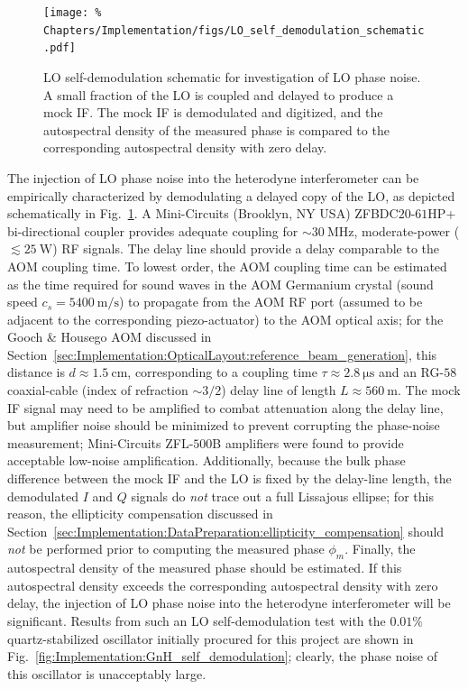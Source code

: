 \begin{figure}
  \centering
  \texttt{[image: \%
    Chapters/Implementation/figs/LO\_self\_demodulation\_schematic.pdf]}
  \caption[LO self-demodulation schematic for investigation of LO phase noise]{%
    LO self-demodulation schematic for investigation of LO phase noise.
    A small fraction of the LO is coupled and delayed to produce a mock IF.
    The mock IF is demodulated and digitized, and
    the autospectral density of the measured phase is compared
    to the corresponding autospectral density with zero delay.
  }
\label{fig:Implementation:LO_self_demodulation_schematic}
\end{figure}

The injection of LO phase noise into the heterodyne interferometer
can be empirically characterized by demodulating
a delayed copy of the LO,
as depicted schematically in
Fig.~\ref{fig:Implementation:LO_self_demodulation_schematic}.
A Mini-Circuits (Brooklyn, NY USA) {ZFBDC$20$-$61$HP+} bi-directional coupler
provides adequate coupling for $\sim \SI{30}{\mega\hertz}$,
moderate-power ($\lesssim \SI{25}{\watt}$) RF signals.
The delay line should provide a delay comparable to the AOM coupling time.
To lowest order, the AOM coupling time can be estimated
as the time required for sound waves in the AOM Germanium crystal
(sound speed $c_s = \SI{5400}{\meter\per\second}$)
to propagate from the AOM RF port
(assumed to be adjacent to the corresponding piezo-actuator)
to the AOM optical axis;
for the Gooch \& Housego AOM discussed in
Section~\ref{sec:Implementation:OpticalLayout:reference_beam_generation},
this distance is $d \approx \SI{1.5}{\centi\meter}$,
corresponding to a coupling time $\tau \approx \SI{2.8}{\micro\second}$ and
an RG-$58$ coaxial-cable (index of refraction $\sim 3 / 2$)
delay line of length $L \approx \SI{560}{\meter}$.
The mock IF signal may need to be amplified
to combat attenuation along the delay line, but
amplifier noise should be minimized
to prevent corrupting the phase-noise measurement;
Mini-Circuits {ZFL-$500$B} amplifiers
were found to provide acceptable low-noise amplification.
Additionally, because the bulk phase difference
between the mock IF and the LO
is fixed by the delay-line length,
the demodulated $I$ and $Q$ signals
do \emph{not} trace out a full Lissajous ellipse;
for this reason, the ellipticity compensation discussed in
Section~\ref{sec:Implementation:DataPreparation:ellipticity_compensation}
should \emph{not} be performed prior to computing the measured phase $\phi_m$.
Finally, the autospectral density of the measured phase
should be estimated.
If this autospectral density exceeds
the corresponding autospectral density with zero delay,
the injection of LO phase noise into the heterodyne interferometer
will be significant.
Results from such an LO self-demodulation test with
the $0.01\%$ quartz-stabilized oscillator
initially procured for this project are shown in
Fig.~\ref{fig:Implementation:GnH_self_demodulation};
clearly, the phase noise of this oscillator
is unacceptably large.


